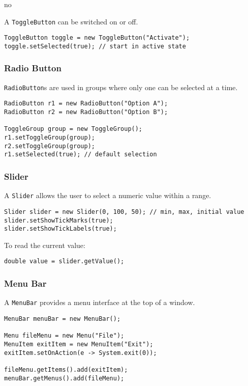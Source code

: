 no\documentclass{article}
\newcommand{\codecmd}[1]{\textcolor[rgb]{0,0.5,0}{\texttt{#1}}}
\begin{document}
A \codecmd{ToggleButton} can be switched on or off.

\begin{verbatim}
ToggleButton toggle = new ToggleButton("Activate");
toggle.setSelected(true); // start in active state
\end{verbatim}

\subsubsection{Radio Button}

\codecmd{RadioButton}s are used in groups where only one can be selected at a time.

\begin{verbatim}
RadioButton r1 = new RadioButton("Option A");
RadioButton r2 = new RadioButton("Option B");

ToggleGroup group = new ToggleGroup();
r1.setToggleGroup(group);
r2.setToggleGroup(group);
r1.setSelected(true); // default selection
\end{verbatim}

\subsubsection{Slider}

A \codecmd{Slider} allows the user to select a numeric value within a range.

\begin{verbatim}
Slider slider = new Slider(0, 100, 50); // min, max, initial value
slider.setShowTickMarks(true);
slider.setShowTickLabels(true);
\end{verbatim}

To read the current value:
\begin{verbatim}
double value = slider.getValue();
\end{verbatim}

\subsubsection{Menu Bar}

A \codecmd{MenuBar} provides a menu interface at the top of a window.

\begin{verbatim}
MenuBar menuBar = new MenuBar();

Menu fileMenu = new Menu("File");
MenuItem exitItem = new MenuItem("Exit");
exitItem.setOnAction(e -> System.exit(0));

fileMenu.getItems().add(exitItem);
menuBar.getMenus().add(fileMenu);
\end{verbatim}
\end{document}
